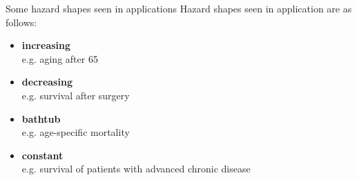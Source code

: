 \documentclass[envcountsect, 10pt, portrait, palatino]{beamer}
\begin{document}
\begin{frame}{Some hazard shapes seen in applications}
Hazard shapes seen in application are as follows:
\begin{itemize}
\item {\bf increasing}\\[1ex]
e.g. aging after 65\\[1ex]
\item{\bf decreasing} \\[1ex]
e.g. survival after surgery\\[1ex]
\item {\bf bathtub} \\[1ex]
e.g. age-specific mortality\\[1ex]
\item {\bf constant} \\[1ex]
e.g. survival of patients with advanced chronic disease
\end{itemize}
\end{frame}
\end{document}
